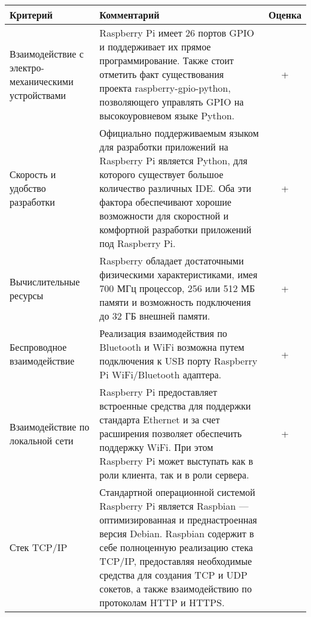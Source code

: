 \documentclass[twoside,a4paper]{msmb} %
\begin{document}
\bgroup
\def\arraystretch{1.5}%

\begin{longtable}{| p{} | p{} | c |} 

\hline
Критерий & Комментарий & Оценка \\
\hline
Взаимодействие с электро-механическими  устройствами &

Raspberry Pi имеет 26 портов GPIO и поддерживает их прямое программирование\cite{RPIHardware}. Также стоит отметить факт существования проекта raspberry-gpio-python, позволяющего управлять GPIO на высокоуровневом языке Python\cite{RPiGPIOPython}. &

+\\

\hline
Скорость и удобство разработки &

Официально поддерживаемым языком для разработки приложений на Raspberry Pi является Python\cite{RPiFAQ}, для которого существует большое количество различных IDE. Оба эти фактора обеспечивают хорошие возможности для скоростной и комфортной разработки приложений под Raspberry Pi. &

+\\

\hline
Вычислительные ресурсы &

Raspberry обладает достаточными физическими характеристиками, имея 700 МГц процессор, 256 или 512 МБ памяти \cite{RPiFAQ} и возможность подключения до 32 ГБ внешней памяти. &

+\\

\hline
Беспроводное взаимодействие &

Реализация взаимодействия по Bluetooth и WiFi возможна путем подключения к USB порту Raspberry Pi WiFi/Bluetooth адаптера. &

+\\

\hline
Взаимодействие по локальной сети &

Raspberry Pi предоставляет встроенные средства для поддержки стандарта Ethernet и за счет расширения позволяет обеспечить поддержку WiFi. При этом Raspberry Pi может выступать как в роли клиента, так и в роли сервера.&

+\\

\hline
Стек TCP/IP &

Стандартной операционной системой Raspberry Pi является Raspbian\cite{Raspbian} --- оптимизированная и преднастроенная версия Debian. Raspbian содержит в себе полноценную реализацию стека TCP/IP, предоставляя необходимые средства для создания TCP и UDP сокетов, а также взаимодействию по протоколам HTTP и HTTPS. &


\end{longtable}
\end{document}
